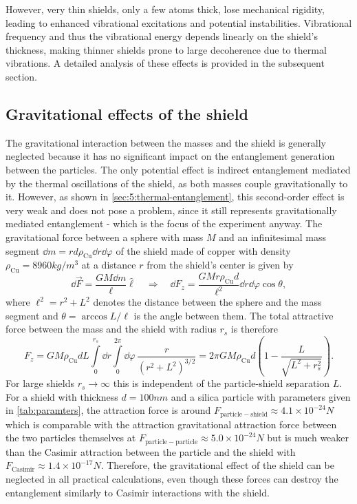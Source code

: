 However, very thin shields, only a few atoms thick, lose mechanical rigidity, leading to enhanced vibrational excitations and potential instabilities.
Vibrational frequency and thus the vibrational energy depends linearly on the shield's thickness, making thinner shields prone to large decoherence due to thermal vibrations.
A detailed analysis of these effects is provided in the subsequent section.



\subsection{Gravitational effects of the shield}\label{subsec:5:shield-gravitation}
The gravitational interaction between the masses and the shield is generally neglected because it has no significant impact on the entanglement generation between the particles.
The only potential effect is indirect entanglement mediated by the thermal oscillations of the shield, as both masses couple gravitationally to it. 
However, as shown in \cref{sec:5:thermal-entanglement}, this second-order effect is very weak and does not pose a problem, since it still represents gravitationally mediated entanglement - which is the focus of the experiment anyway.
The gravitational force between a sphere with mass $M$ and an infinitesimal mass segment $\dd m = r d \rho_\mathrm{Cu} \dd r \dd \varphi$ of the shield made of copper with density $\rho_\mathrm{Cu} = 8960\si{kg/m^3}$ at a distance $r$ from the shield's center is given by
\begin{equation}
  \dd \vec{F} = \frac{G M \dd m}{\ell} \boldsymbol{\hat{\ell}} 
  \quad \Rightarrow \quad
  \dd F_z = \frac{G M r \rho_\mathrm{Cu} d}{\ell^2} \dd r \dd \varphi \cos \theta,
\end{equation}
where $\ell^2 = r^2 + L^2$ denotes the distance between the sphere and the mass segment and $\theta = \arccos L/\ell$ is the angle between them.
The total attractive force between the mass and the shield with radius $r_s$ is therefore
\begin{equation}
  F_z = GM \rho_\mathrm{Cu} d L \int\limits_{0}^{r_s} \dd r \int\limits_{0}^{2\pi} \dd \varphi \, \frac{r}{(r^2 + L^2)^{3/2}} = 2\pi G M \rho_\mathrm{Cu} d \left(1 - \frac{L}{\sqrt{L^2 + r_s^2}}\right) .
\end{equation}
For large shields $r_s \rightarrow \infty$ this is independent of the particle-shield separation $L$.
For a shield with thickness $d = 100\si{nm}$ and a silica particle with parameters given in \cref{tab:paramters}, the attraction force is around $F_\mathrm{particle-shield} \approx 4.1\times 10^{-24} \si{N}$ which is comparable with the attraction gravitational attraction force between the two particles themselves at $F_\mathrm{particle-particle} \approx 5.0 \times 10^{-24}\si{N}$ but is much weaker than the Casimir attraction between the particle and the shield with $F_\mathrm{Casimir} \approx 1.4 \times 10^{-17} \si{N}$.
Therefore, the gravitational effect of the shield can be neglected in all practical calculations, even though these forces can destroy the entanglement similarly to Casimir interactions with the shield.